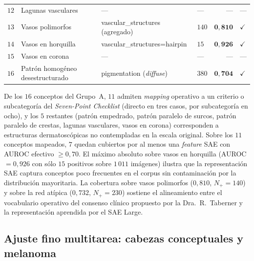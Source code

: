 \begin{table}[H]
\begin{tabular}{rlllrl}
$12$ & Lagunas vasculares                   & ---                                  & ---   & ---                 & --- \\
$13$ & Vasos polimorfos                     & vascular\_structures (agregado)     & $140$ & $\mathbf{0{,}810}$  & $\checkmark$ \\
$14$ & Vasos en horquilla                   & vascular\_structures=hairpin        & $15$  & $\mathbf{0{,}926}$  & $\checkmark$ \\
$15$ & Vasos en corona                      & ---                                  & ---   & ---                 & --- \\
$16$ & Patrón homogéneo desestructurado     & pigmentation (\emph{diffuse})       & $380$ & $\mathbf{0{,}704}$  & $\checkmark$ \\
\hline
\end{tabular}
\end{table}

De los $16$ conceptos del Grupo~A, $11$ admiten \emph{mapping}
operativo a un criterio o subcategoría del \emph{Seven-Point
Checklist} (directo en tres casos, por subcategoría en ocho), y
los $5$ restantes (patrón empedrado, patrón paralelo de surcos,
patrón paralelo de crestas, lagunas vasculares, vasos en corona)
corresponden a estructuras dermatoscópicas no contempladas en la
escala original. Sobre los $11$ conceptos mapeados, $7$ quedan
cubiertos por al menos una \emph{feature} SAE con AUROC efectivo
$\geq 0{,}70$. El máximo absoluto sobre vasos en horquilla
(AUROC $= 0{,}926$ con sólo $15$ positivos sobre $1\,011$
imágenes) ilustra que la representación SAE captura conceptos
poco frecuentes en el corpus sin contaminación por la
distribución mayoritaria. La cobertura sobre vasos polimorfos
($0{,}810$, $N_{+} = 140$) y sobre la red atípica
($0{,}732$, $N_{+} = 230$) sostiene el alineamiento entre el
vocabulario operativo del consenso clínico propuesto por la
Dra.~R.~Taberner y la representación aprendida por el SAE Large.

\subsection*{Ajuste fino multitarea: cabezas conceptuales y
melanoma}
\label{sec:sae-d7pt-e4}

